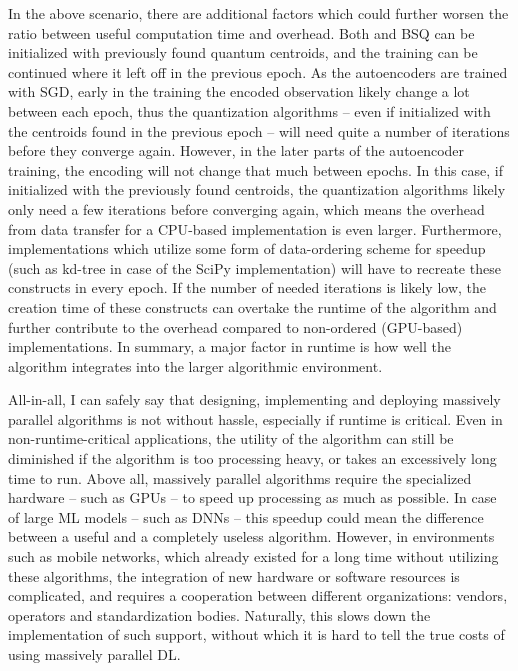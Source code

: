 		In the above scenario, there are additional factors which could further worsen the ratio between useful computation time and overhead.
		Both \kmeans{} and \ac{BSQ} can be initialized with previously found quantum centroids, and the training can be continued where it left off in the previous epoch.
		As the autoencoders are trained with \ac{SGD}, early in the training the encoded observation likely change a lot between each epoch, thus the quantization algorithms -- even if initialized with the centroids found in the previous epoch -- will need quite a number of iterations before they converge again.
		However, in the later parts of the autoencoder training, the encoding will not change that much between epochs.
		In this case, if initialized with the previously found centroids, the quantization algorithms likely only need a few iterations before converging again, which means the overhead from data transfer for a \ac{CPU}-based implementation is even larger.
		Furthermore, implementations which utilize some form of data-ordering scheme for speedup (such as kd-tree in case of the SciPy \kmeans{} implementation) will have to recreate these constructs in every epoch.
		If the number of needed iterations is likely low, the creation time of these constructs can overtake the runtime of the algorithm and further contribute to the overhead compared to non-ordered (\ac{GPU}-based) implementations.
		In summary, a major factor in runtime is how well the algorithm integrates into the larger algorithmic environment.

		All-in-all, I can safely say that designing, implementing and deploying massively parallel algorithms is not without hassle, especially if runtime is critical.
		Even in non-runtime-critical applications, the utility of the algorithm can still be diminished if the algorithm is too processing heavy, or takes an excessively long time to run.
		Above all, massively parallel algorithms require the specialized hardware -- such as \acp{GPU} -- to speed up processing as much as possible.
		In case of large \ac{ML} models -- such as \acp{DNN} -- this speedup could mean the difference between a useful and a completely useless algorithm.
		However, in environments such as mobile networks, which already existed for a long time without utilizing these algorithms, the integration of new hardware or software resources is complicated, and requires a cooperation between different organizations: vendors, operators and standardization bodies.
		Naturally, this slows down the implementation of such support, without which it is hard to tell the true costs of using massively parallel \ac{DL}.
